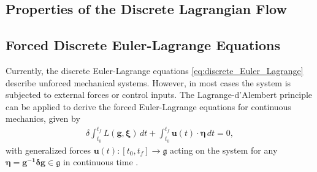 \subsection{Properties of the Discrete Lagrangian Flow}

\subsection{Forced Discrete Euler-Lagrange Equations}
\label{sec:discrete_forced_lagrangian}

Currently, the discrete Euler-Lagrange equations \eqref{eq:discrete_Euler_Lagrange} describe unforced mechanical systems. 
However, in most cases the system is subjected to external forces or control inputs. The Lagrange-d'Alembert principle can be applied to derive the forced 
Euler-Lagrange equations for continuous mechanics, given by
\begin{align}
    \delta \int_{t_0}^{t_f} L(\bm{g}, \bm{\xi})\, dt + \int_{t_0}^{t_f} \bm{u}(t) \cdot \bm{\eta}\, dt = 0,
\end{align}
with generalized forces $\bm{u}(t):[t_0, t_f] \to \bm{\mathfrak{g}}$ acting on the system for any $\bm{\eta = \bm{g}^{-1} \delta \bm{g} \in \bm{\mathfrak{g}}}$ in continuous time \cite{Lee2008}. 

